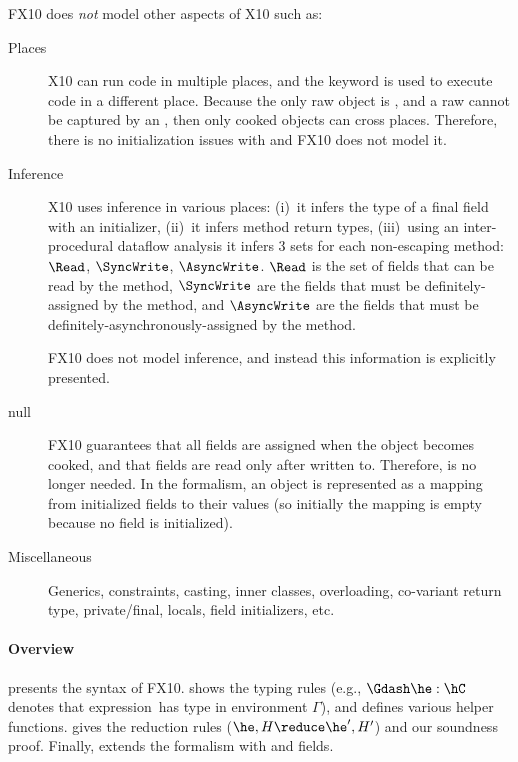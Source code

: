 \documentclass[a4paper]{article}
\begin{document}
FX10 does \emph{not} model other aspects of X10 such as:
\begin{description}
  \item[Places] X10 can run code in multiple places, and the  keyword is used to execute code in a different place.
    Because the only raw object is \this,
        and a raw \this cannot be captured by an ,
        then only cooked objects can cross places.
    Therefore, there is no initialization issues with  and FX10 does not model it.
  \item[Inference]
    X10 uses inference in various places:
        (i)~it infers the type of a final field with an initializer,
        (ii)~it infers method return types,
        (iii)~using an inter-procedural dataflow analysis it infers
            3 sets for each non-escaping method: $\Read$, $\SyncWrite$, $\AsyncWrite$.
            $\Read$ is the set of fields that can be read by the method,
                $\SyncWrite$ are the fields that must be definitely-assigned by the method,
                and $\AsyncWrite$ are the fields that must be definitely-asynchronously-assigned by the method.

    FX10 does not model inference, and instead this information is explicitly presented.
  \item[null]
    FX10 guarantees that all fields are assigned when the object becomes cooked,
        and that fields are read only after written to.
    Therefore, \hnull is no longer needed.
    In the formalism, an object is represented as a mapping from initialized fields to their values
    (so initially the mapping is empty because no field is initialized).

  \item[Miscellaneous]
    Generics, constraints, casting, inner classes, overloading, co-variant return type, private/final,
    locals, field initializers, etc.
\end{description}


\paragraph{Overview}
 presents the syntax of FX10.
 shows the typing rules
    (e.g., $\Gdash \he:\hC$ denotes that expression~\he has type \hC in environment $\Gamma$),
    and defines various helper functions.
 gives the reduction rules ($\he,H \reduce \he',H'$) and our soundness proof.
Finally,  extends the formalism with \hval and \hvar fields.
\end{document}
